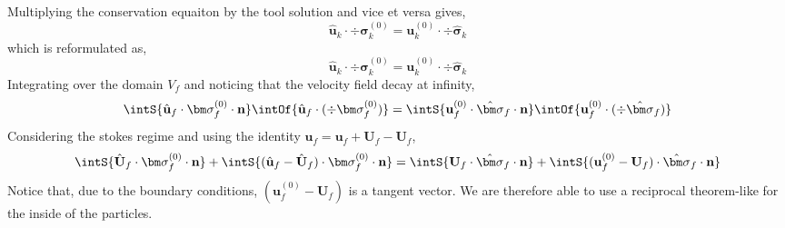 Multiplying the conservation equaiton by the tool solution and vice et versa gives, 
\begin{equation*}
    \hat{\textbf{u}}_k\cdot \div \bm\sigma_k^{(0)}
    = 
    \textbf{u}_k^{(0)}\cdot \div \hat{\bm\sigma}_k
\end{equation*}
which is reformulated as, 
\begin{equation*}
    \hat{\textbf{u}}_k\cdot \div \bm\sigma_k^{(0)}
    = 
    \textbf{u}_k^{(0)}\cdot \div \hat{\bm\sigma}_k
\end{equation*}
Integrating over the domain $V_f$ and noticing that the velocity field decay at infinity, 
\begin{equation*}
    \intS{\hat{\textbf{u}}_f\cdot  \bm\sigma_f^{(0)} \cdot \textbf{n}}
    \intOf{\hat{\textbf{u}}_f\cdot  (\div \bm\sigma_f^{(0)})}
    = 
    \intS{\textbf{u}_f^{(0)}\cdot  \hat{\bm\sigma}_f \cdot \textbf{n}}
    \intOf{\textbf{u}_f^{(0)}\cdot ( \div \hat{\bm\sigma}_f)}
\end{equation*}
Considering the stokes regime and using the identity $\textbf{u}_f = \textbf{u}_f +\textbf{U}_f-\textbf{U}_f$, 
\begin{equation*}
    \intS{\hat{\textbf{U}}_f\cdot  \bm\sigma_f^{(0)} \cdot \textbf{n}     }
    + \intS{(\hat{\textbf{u}}_f - \hat{\textbf{U}}_f)\cdot  \bm\sigma_f^{(0)} \cdot \textbf{n}}
    = 
    \intS{\textbf{U}_f\cdot  \hat{\bm\sigma}_f \cdot \textbf{n}}
    + \intS{(\textbf{u}_f^{(0)} - \textbf{U}_f)\cdot  \hat{\bm\sigma}_f \cdot \textbf{n}}
\end{equation*}
Notice that, due to the boundary conditions, $(\textbf{u}_f^{(0)} - \textbf{U}_f)$ is a tangent vector. 
We are therefore able to use a reciprocal theorem-like for the inside of the particles. 

